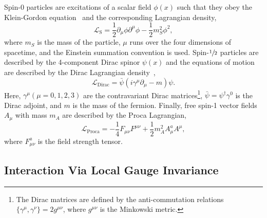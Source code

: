Spin-0 particles are excitations of a scalar field $\phi(x)$ such that they obey the Klein-Gordon equation~\cite{Klein1926} and the corresponding Lagrangian density,
\begin{equation}
	\label{eq:scalar_lagrangian}
	\mathcal{L}_\text{S} = \frac{1}{2} \partial_\mu \phi \partial^\mu \phi - \frac{1}{2} m_S^2 \phi^2,
\end{equation}
where $m_S$ is the mass of the particle, $\mu$ runs over the four dimensions of spacetime, and the Einstein summation convention is used.
Spin-$\sfrac{1}{2}$ particles are described by the 4-component Dirac spinor $\psi(x)$ and the equations of motion are described by the Dirac Lagrangian density~\cite{Dirac1928},
\begin{equation}
	\label{eq:dirac_lagrangian}
	\mathcal{L}_\text{Dirac} = \bar{\psi} (i \gamma^\mu \partial_\mu - m) \psi.
\end{equation}
Here, $\gamma^\mu(\mu=0,1,2,3)$ are the contravariant Dirac matrices\footnote{The Dirac matrices are defined by the anti-commutation relations$\{ \gamma^\mu, \gamma^\nu \} = 2 g^{\mu\nu}$, where $g^{\mu\nu}$ is the Minkowski metric.}, $\bar{\psi} = \psi^\dagger \gamma^0$ is the Dirac adjoint, and $m$ is the mass of the fermion.
Finally, free spin-1 vector fields $A_\mu$ with mass $m_A$ are described by the Proca Lagrangian,
\begin{equation}
	\label{eq:proca_lagrangian}
	\mathcal{L}_\text{Proca} = -\frac{1}{4} F_{\mu\nu} F^{\mu\nu} + \frac{1}{2} m_A^2 A_\mu^a A^{\mu},
\end{equation}
where $F_{\mu\nu}^a$ is the field strength tensor.

\subsection{Interaction Via Local Gauge Invariance}
\label{sec:local_gauge_invariance}

